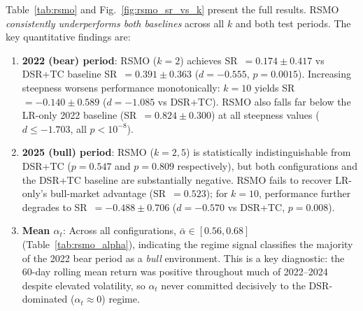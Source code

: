 \documentclass[conference]{IEEEtran}
\begin{document}
Table~\ref{tab:rsmo} and Fig.~\ref{fig:rsmo_sr_vs_k} present the full
results. RSMO \emph{consistently underperforms both baselines} across
all $k$ and both test periods. The key quantitative findings are:

\begin{enumerate}
  \item \textbf{2022 (bear) period}: RSMO ($k=2$) achieves
    SR~$=0.174\pm0.417$ vs DSR+TC baseline SR~$=0.391\pm0.363$
    ($d=-0.555$, $p=0.0015$). Increasing steepness worsens performance
    monotonically: $k=10$ yields SR~$=-0.140\pm0.589$
    ($d=-1.085$ vs DSR+TC). RSMO also falls far below the LR-only 2022
    baseline (SR~$=0.824\pm0.300$) at all steepness values
    ($d \leq -1.703$, all $p<10^{-8}$).

  \item \textbf{2025 (bull) period}: RSMO ($k=2,5$) is statistically
    indistinguishable from DSR+TC ($p=0.547$ and $p=0.809$ respectively),
    but both configurations and the DSR+TC baseline are substantially
    negative. RSMO fails to recover LR-only's bull-market advantage
    (SR~$=0.523$); for $k=10$, performance further degrades to
    SR~$=-0.488\pm0.706$ ($d=-0.570$ vs DSR+TC, $p=0.008$).

  \item \textbf{Mean $\alpha_t$}: Across all configurations,
    $\bar{\alpha} \in [0.56, 0.68]$ (Table~\ref{tab:rsmo_alpha}),
    indicating the regime signal classifies the majority of the 2022
    bear period as a \emph{bull} environment. This is a key diagnostic:
    the 60-day rolling mean return was positive throughout much of
    2022--2024 despite elevated volatility, so $\alpha_t$ never
    committed decisively to the DSR-dominated ($\alpha_t \approx 0$)
    regime.
\end{enumerate}

\begin{table}[t]
\caption{EXP-20: Regime Signal and Bull/Bear Sharpe Decomposition}
\label{tab:rsmo_alpha}
\centering
{}
\end{table}
\end{document}
